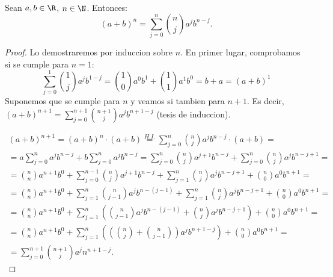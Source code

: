 \begin{theorem}
	Sean \(a,b \in \R \), \(n \in \N \). Entonces:
	\[
		(a+b)^{n} = \sum_{j =0 }^{n } \binom{n }{j } a^{j} b^{n-j }.
	\]
\end{theorem}
\begin{proof}
	Lo demostraremos por induccion sobre \(n \). En primer lugar, comprobamos si se cumple para \(n = 1 \):
	\[
		\sum_{j =0 }^{1 } \binom{1 }{j } a^{j} b^{1-j } = \binom{1 }{0 } a^{0 } b^{1 } + \binom{1 }{1 } a^{1 } b^{0} = b + a = (a+b)^{1}
	\]
	Suponemos que se cumple para \(n \) y veamos si tambien para \(n + 1 \). Es decir, \((a+b)^{n+1} = \sum_{j =0 }^{n+1 } \binom{n+ 1 }{j } a^{j } b^{n + 1 - j } \) (tesis de induccion).

	\begin{multline*}
		(a+b)^{n+1} = (a+b)^{n} \cdot (a+b) \overset{H.I.}{=} \sum_{j =0 }^{n } \binom{n }{j } a^{j} b^{n-j } \cdot (a+b) = \\
		= a \sum_{j =0 }^{n } a^{j} b^{n-j } + b \sum_{j =0 }^{n } a^{j} b^{n-j } = \sum_{j =0 }^{n } \binom{n }{j }a^{j+1} b^{n-j } + \sum_{j =0 }^{n } \binom{n }{j } a^{j} b^{n-j+1} = \\
		= \binom{n }{n } a^{n+1} b^{0 } + \sum_{j =0 }^{n- 1} \binom{n }{j } a^{j+ 1 } b^{n-j } + \sum_{j =1}^{n }  \binom{n }{j } a^{j } b^{n-j + 1 } + \binom{n }{0} a^{0 }b^{n+1} = \\
		= \binom{n }{n }a^{n+1 } b^{0} + \sum_{j =1 }^{n} \binom{n }{j - 1} a^{j}b^{n-(j-1)} + \sum_{j =1}^{n } \binom{n }{j }a^{j } b^{n-j+1 } + \binom{n }{0 }a^{0 } b^{n+1 } = \\
		= \binom{n }{n }a^{n+1 } b^{0} + \sum_{j =1}^{n } \left (\binom{n }{j - 1 } a^{j } b^{n-(j-1)} + \binom{n }{j } a^{j } b^{n-j+1}\right ) + \binom{n}{0} a^{0 } b^{n+1} =  \\
		= \binom{n }{n }a^{n+1 } b^{0 } + \sum_{j=1}^{n} \left ( \left (\binom{n }{j } + \binom{n }{j - 1} \right ) a^{j }b^{n+1-j}  \right ) + \binom{n }{0 }a^{0 } b^{n+1} = \\
		= \boxed{\sum_{j =0 }^{n+ 1} \binom{n + 1 }{j }a^{j } n^{n+1-j }}.
	\end{multline*}
\end{proof}

